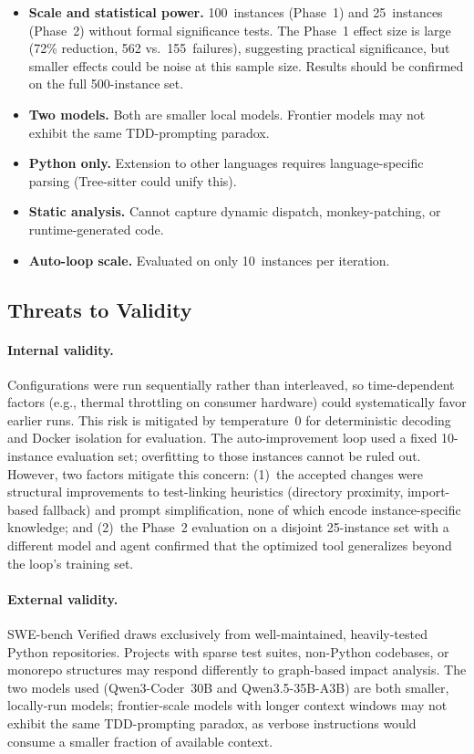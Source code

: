 \documentclass[sigconf,nonacm]{acmart}
\begin{document}
\begin{itemize}
  \item \textbf{Scale and statistical power.} 100~instances (Phase~1) and
    25~instances (Phase~2) without formal significance tests.  The Phase~1
    effect size is large (72\% reduction, 562 vs.\ 155~failures), suggesting
    practical significance, but smaller effects could be noise at this
    sample size.  Results should be confirmed on the full 500-instance set.
  \item \textbf{Two models.} Both are smaller local models.  Frontier models
    may not exhibit the same TDD-prompting paradox.
  \item \textbf{Python only.} Extension to other languages requires
    language-specific parsing (Tree-sitter could unify this).
  \item \textbf{Static analysis.} Cannot capture dynamic dispatch,
    monkey-patching, or runtime-generated code.
  \item \textbf{Auto-loop scale.} Evaluated on only 10~instances per
    iteration.
\end{itemize}

\subsection{Threats to Validity}

\paragraph{Internal validity.}
Configurations were run sequentially rather than interleaved, so
time-dependent factors (e.g., thermal throttling on consumer hardware)
could systematically favor earlier runs.  This risk is mitigated by
temperature~0 for deterministic decoding and Docker isolation for
evaluation.  The auto-improvement loop used a fixed 10-instance
evaluation set; overfitting to those instances cannot be ruled out.
However, two factors mitigate this concern: (1)~the accepted changes
were structural improvements to test-linking heuristics (directory
proximity, import-based fallback) and prompt simplification, none of
which encode instance-specific knowledge; and (2)~the Phase~2 evaluation
on a disjoint 25-instance set with a different model and agent confirmed
that the optimized tool generalizes beyond the loop's training set.

\paragraph{External validity.}
SWE-bench Verified draws exclusively from well-maintained,
heavily-tested Python repositories.  Projects with sparse test suites,
non-Python codebases, or monorepo structures may respond differently to
graph-based impact analysis.  The two models used (Qwen3-Coder~30B and
Qwen3.5-35B-A3B) are both smaller, locally-run models; frontier-scale
models with longer context windows may not exhibit the same
TDD-prompting paradox, as verbose instructions would consume a smaller
fraction of available context.
\end{document}
